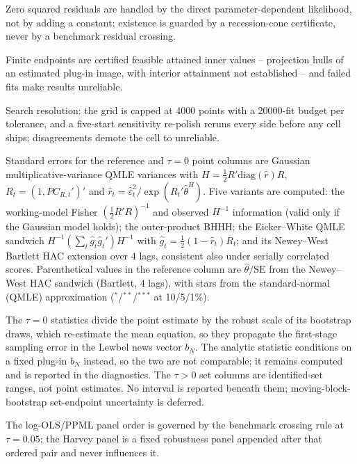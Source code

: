 \documentclass[11pt]{article}
\begin{document}
\begin{table}[!htbp]
\begin{threeparttable}
\begin{tablenotes}[flushleft]
\item Zero squared residuals are handled by the direct parameter-dependent likelihood, not by adding a constant; existence is guarded by a recession-cone certificate, never by a benchmark residual crossing.
\item Finite endpoints are certified feasible attained inner values -- projection hulls of an estimated plug-in image, with interior attainment not established -- and failed fits make results unreliable.
\item Search resolution: the grid is capped at 4000 points with a 20000-fit budget per tolerance, and a five-start sensitivity re-polish reruns every side before any cell ships; disagreements demote the cell to unreliable.
\item Standard errors for the reference and $\tau{=}0$ point columns are Gaussian multiplicative-variance QMLE variances with $H = \frac{1}{2}R'\mathrm{diag}(\hat r)R$, $R_t = (1, PC_{R,t}')'$ and $\hat r_t = \hat\varepsilon_t^2 / \exp(R_t'\hat\theta^{H})$. Five variants are computed: the working-model Fisher $(\frac{1}{2}R'R)^{-1}$ and observed $H^{-1}$ information (valid only if the Gaussian model holds); the outer-product BHHH; the Eicker--White QMLE sandwich $H^{-1} (\sum_t \hat g_t \hat g_t')H^{-1}$ with $\hat g_t = \frac{1}{2}(1 - \hat r_t)R_t$; and its Newey--West Bartlett HAC extension over 4 lags, consistent also under serially correlated scores. Parenthetical values in the reference column are $\hat\theta/\mathrm{SE}$ from the Newey--West HAC sandwich (Bartlett, 4 lags), with stars from the standard-normal (QMLE) approximation ($^{*}$/$^{**}$/$^{***}$ at 10/5/1\%).
\item The $\tau{=}0$ statistics divide the point estimate by the robust scale of its bootstrap draws, which re-estimate the mean equation, so they propagate the first-stage sampling error in the Lewbel news vector $b_N$. The analytic statistic conditions on a fixed plug-in $b_N$ instead, so the two are not comparable; it remains computed and is reported in the diagnostics. The $\tau{>}0$ set columns are identified-set ranges, not point estimates. No interval is reported beneath them; moving-block-bootstrap set-endpoint uncertainty is deferred.
\item The log-OLS/PPML panel order is governed by the benchmark crossing rule at $\tau{=}0.05$; the Harvey panel is a fixed robustness panel appended after that ordered pair and never influences it.
\end{tablenotes}
\end{threeparttable}
\end{table}
\end{document}
